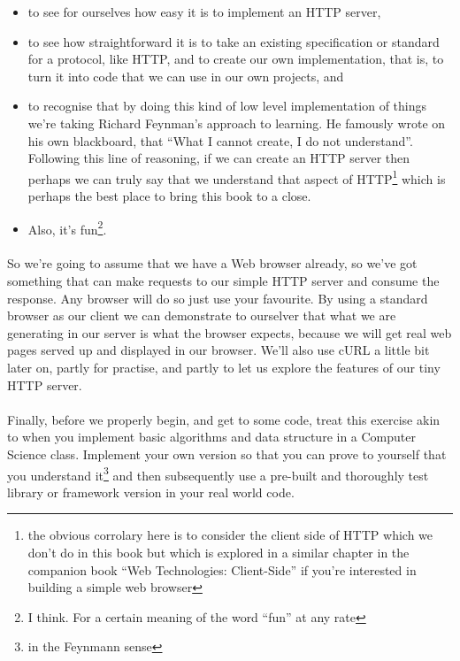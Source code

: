 \begin{itemize}
\item to see for ourselves how easy it is to implement an HTTP server,
\item to see how straightforward it is to take an existing specification or standard for a protocol, like HTTP, and to create our own implementation, that is, to turn it into code that we can use in our own projects, and
\item to recognise that by doing this kind of low level implementation of things we're taking Richard Feynman's approach to learning. He famously wrote on his own blackboard, that ``What I cannot create, I do not understand''. Following this line of reasoning, if we can create an HTTP server then perhaps we can truly say that we understand that aspect of HTTP\footnote{the obvious corrolary here is to consider the client side of HTTP which we don't do in this book but which is explored in a similar chapter in the companion book ``Web Technologies: Client-Side'' if you're interested in building a simple web browser} which is perhaps the best place to bring this book to a close.
\item Also, it's fun\footnote{I think. For a certain meaning of the word ``fun'' at any rate}.
\end{itemize}

\paragraph{} So we're going to assume that we have a Web browser already, so we've got something that can make requests to our simple HTTP server and consume the response. Any browser will do so just use your favourite. By using a standard browser as our client we can demonstrate to ourselver that what we are generating in our server is what the browser expects, because we will get real web pages served up and displayed in our browser. We'll also use cURL a little bit later on, partly for practise, and partly to let us explore the features of our tiny HTTP server.

\paragraph{} Finally, before we properly begin, and get to some code, treat this exercise akin to when you implement basic algorithms and data structure in a Computer Science class. Implement your own version so that you can prove to yourself that you understand it\footnote{in the Feynmann sense} and then subsequently use a pre-built and thoroughly test library or framework version in your real world code. 

